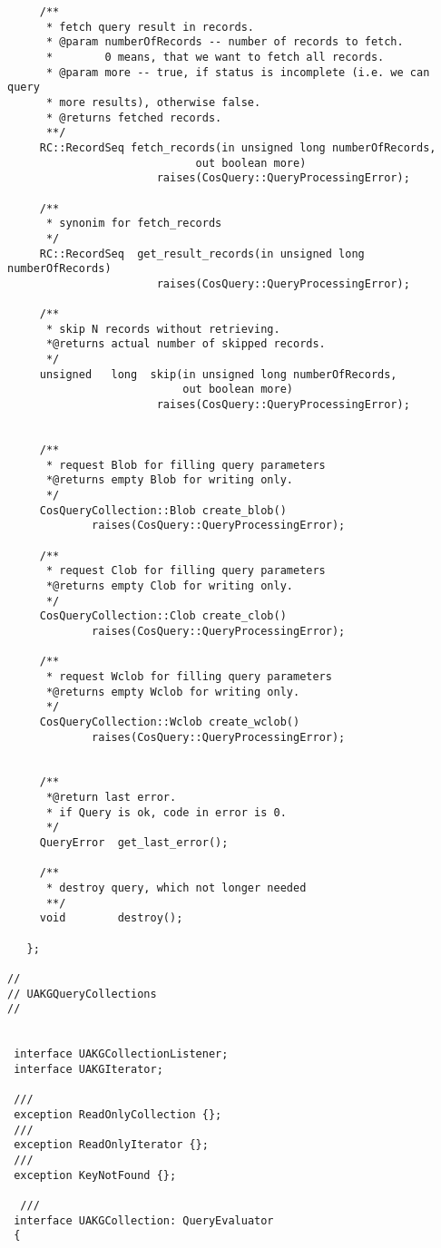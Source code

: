 \documentclass[10pt]{article}
\begin{document}
\begin{verbatim}
     /**
      * fetch query result in records.
      * @param numberOfRecords -- number of records to fetch.
      *        0 means, that we want to fetch all records.
      * @param more -- true, if status is incomplete (i.e. we can query
      * more results), otherwise false.
      * @returns fetched records.
      **/
     RC::RecordSeq fetch_records(in unsigned long numberOfRecords,
                             out boolean more)
                       raises(CosQuery::QueryProcessingError);

     /**
      * synonim for fetch_records
      */
     RC::RecordSeq  get_result_records(in unsigned long numberOfRecords)
                       raises(CosQuery::QueryProcessingError);

     /**
      * skip N records without retrieving.
      *@returns actual number of skipped records.
      */
     unsigned   long  skip(in unsigned long numberOfRecords,
                           out boolean more)
                       raises(CosQuery::QueryProcessingError);


     /**
      * request Blob for filling query parameters
      *@returns empty Blob for writing only.
      */
     CosQueryCollection::Blob create_blob()
             raises(CosQuery::QueryProcessingError);

     /**
      * request Clob for filling query parameters
      *@returns empty Clob for writing only.
      */
     CosQueryCollection::Clob create_clob()
             raises(CosQuery::QueryProcessingError);

     /**
      * request Wclob for filling query parameters
      *@returns empty Wclob for writing only.
      */
     CosQueryCollection::Wclob create_wclob()
             raises(CosQuery::QueryProcessingError);


     /**
      *@return last error.
      * if Query is ok, code in error is 0.
      */
     QueryError  get_last_error();

     /**
      * destroy query, which not longer needed
      **/
     void        destroy();

   };

//
// UAKGQueryCollections
//


 interface UAKGCollectionListener;
 interface UAKGIterator;

 ///
 exception ReadOnlyCollection {};
 ///
 exception ReadOnlyIterator {};
 ///
 exception KeyNotFound {};

  ///
 interface UAKGCollection: QueryEvaluator
 {


\end{verbatim}
\end{document}
